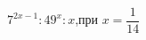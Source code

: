 \begin{ex}[type=calculate_expression]
	\begin{condition}
		\( 7^{2x-1}:49^x:x \),\quad при \( x=\dfrac{1}{14} \)
	\end{condition}
\end{ex}